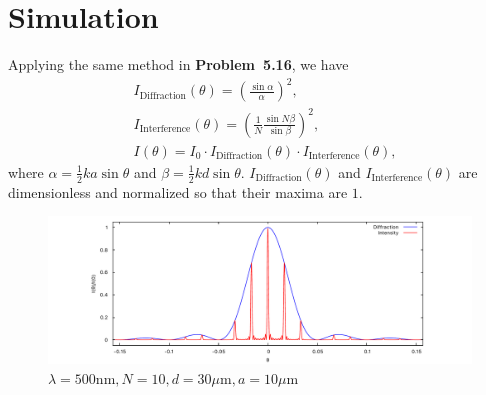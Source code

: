 \documentclass[11pt, twoside]{article}   	%
\theoremstyle{plain}
\theoremstyle{definition}
\begin{document}
	\section{Simulation}

	Applying the same method in \textbf{Problem~5.16}, we have
	\begin{align}
		&I_{\text{Diffraction}}(\theta) = \left( \frac{\sin\alpha}{\alpha} \right)^2,\\
		&I_{\text{Interference}}(\theta) = \left( \frac{1}{N} \frac{\sin N\beta}{\sin\beta}
		\right)^2,\\
		&I(\theta) = I_0 \cdot I_{\text{Diffraction}}(\theta) \cdot I_{\text{Interference}}(\theta),
	\end{align}
	where $\alpha = \frac{1}{2} k a \sin\theta$ and $\beta = \frac{1}{2} k d \sin\theta$.
	$I_{\text{Diffraction}}(\theta)$ and $I_{\text{Interference}}(\theta)$ are dimensionless and
	normalized so that their maxima are $1$.

	\begin{figure}[htbp]
		\centering
		\includegraphics[width=\linewidth]{DiffractionFactor}
		\caption{$\lambda = 500\mathrm{nm}, N = 10, d = 30\mu\mathrm{m}, a = 10\mu\mathrm{m}$}
	\end{figure}
	
\end{document}
